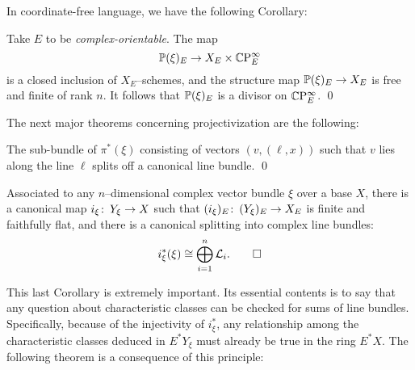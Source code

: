 In coordinate-free language, we have the following Corollary:
\begin{corollary}
Take $E$ to be \emph{complex-orientable}.  The map \[\P(\xi)_E \to X_E \times \CP^\infty_E\] is a closed inclusion of $X_E$--schemes, and the structure map $\P(\xi)_E \to X_E$ is free and finite of rank $n$.  It follows that $\P(\xi)_E$ is a divisor on $\CP^\infty_E$. \qed
\end{corollary}

The next major theorems concerning projectivization are the following:

\begin{corollary}
The sub-bundle of $\pi^*(\xi)$ consisting of vectors $(v, (\ell, x))$ such that $v$ lies along the line $\ell$ splits off a canonical line bundle. \qed
\end{corollary}

\begin{corollary}
Associated to any $n$--dimensional complex vector bundle $\xi$ over a base $X$, there is a canonical map $i_\xi\co Y_\xi \to X$ such that $(i_\xi)_E\co (Y_\xi)_E \to X_E$ is finite and faithfully flat, and there is a canonical splitting into complex line bundles: \[i_\xi^*(\xi) \cong \bigoplus_{i=1}^n \L_i. \qed\]
\end{corollary}

This last Corollary is extremely important.  Its essential contents is to say that any question about characteristic classes can be checked for sums of line bundles.  Specifically, because of the injectivity of $i_\xi^*$, any relationship among the characteristic classes deduced in $E^* Y_\xi$ must already be true in the ring $E^* X$.  The following theorem is a consequence of this principle:

